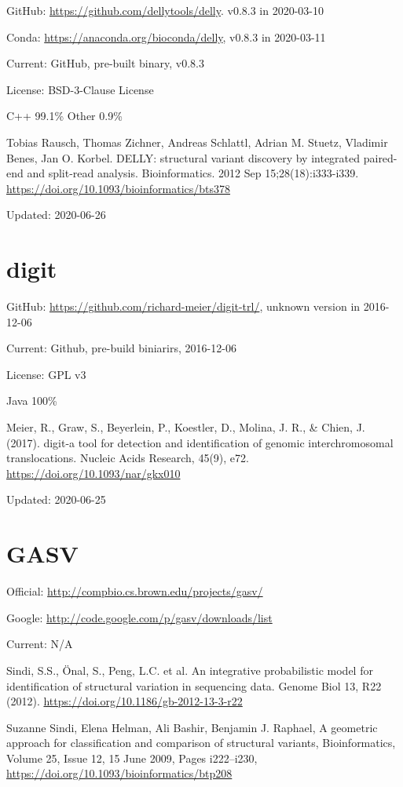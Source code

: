 \documentclass[]{article}
\begin{document}
GitHub: \url{https://github.com/dellytools/delly}. v0.8.3 in 2020-03-10

Conda: \url{https://anaconda.org/bioconda/delly}, v0.8.3 in 2020-03-11

Current: GitHub, pre-built binary, v0.8.3

License:  BSD-3-Clause License 

C++ 99.1\% Other 0.9\%

Tobias Rausch, Thomas Zichner, Andreas Schlattl, Adrian M. Stuetz, Vladimir Benes, Jan O. Korbel. DELLY: structural variant discovery by integrated paired-end and split-read analysis. Bioinformatics. 2012 Sep 15;28(18):i333-i339. \url{https://doi.org/10.1093/bioinformatics/bts378}

Updated: 2020-06-26

\section{digit}

GitHub: \url{https://github.com/richard-meier/digit-trl/}, unknown version in 2016-12-06

Current: Github, pre-build biniarirs, 2016-12-06

License: GPL v3

Java 100\%

Meier, R., Graw, S., Beyerlein, P., Koestler, D., Molina, J. R., \& Chien, J. (2017). digit-a tool for detection and identification of genomic interchromosomal  translocations. Nucleic Acids Research, 45(9), e72. \url{https://doi.org/10.1093/nar/gkx010}

Updated: 2020-06-25

\section{GASV}

Official: \url{http://compbio.cs.brown.edu/projects/gasv/}

Google: \url{http://code.google.com/p/gasv/downloads/list}

Current: N/A

Sindi, S.S., Önal, S., Peng, L.C. et al. An integrative probabilistic model for identification of structural variation in sequencing data. Genome Biol 13, R22 (2012). \url{https://doi.org/10.1186/gb-2012-13-3-r22}

Suzanne Sindi, Elena Helman, Ali Bashir, Benjamin J. Raphael, A geometric approach for classification and comparison of structural variants, Bioinformatics, Volume 25, Issue 12, 15 June 2009, Pages i222–i230, \url{https://doi.org/10.1093/bioinformatics/btp208}
\end{document}
